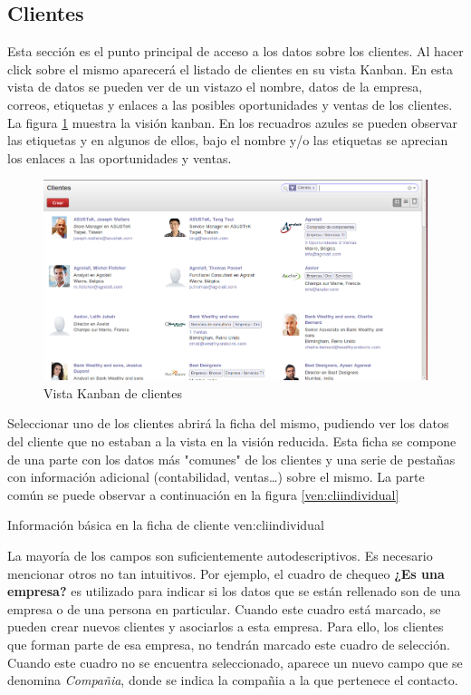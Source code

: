 \subsection{Clientes}
\label{ven:clientes}
Esta sección es el punto principal de acceso a los datos sobre los clientes. Al hacer click
sobre el mismo aparecerá el listado de clientes en su vista Kanban. En esta vista de datos
se pueden ver de un vistazo el nombre, datos de la empresa, correos, etiquetas y 
enlaces a las posibles oportunidades y ventas de los clientes. La figura \ref{ven:clikanban}
muestra la visión kanban. En los recuadros azules se pueden observar las etiquetas
y en algunos de ellos, bajo el nombre y/o las etiquetas se aprecian los enlaces a 
las oportunidades y ventas.

\begin{figure}[H]
\includegraphics[width=\textwidth]{ventas/img/ven_clikanban.png}
\caption{Vista Kanban de clientes}
\label{ven:clikanban}
\end{figure}

Seleccionar uno de los clientes abrirá la ficha del mismo, pudiendo ver los datos del 
cliente que no estaban a la vista en la visión reducida. Esta ficha se compone de una
parte con los datos más "comunes" de los clientes y una serie de pestañas con información
adicional (contabilidad, ventas\ldots) sobre el mismo. La parte común se puede observar a
continuación en la figura \ref{ven:cliindividual}

{Información básica en la ficha de cliente}
{ven:cliindividual}


La mayoría de los campos son suficientemente autodescriptivos. Es necesario
mencionar otros no tan intuitivos. Por ejemplo, el cuadro de chequeo \textbf{¿Es una empresa?}
es utilizado para indicar si los datos que se están rellenado son de una empresa o 
de una persona en particular. Cuando este cuadro está marcado, se pueden crear nuevos
clientes y asociarlos a esta empresa. Para ello, los clientes que forman parte de esa
empresa, no tendrán marcado este cuadro de selección. Cuando este cuadro no se encuentra
seleccionado, aparece un nuevo campo que se denomina \emph{Compañia}, donde se indica
la compañia a la que pertenece el contacto.

